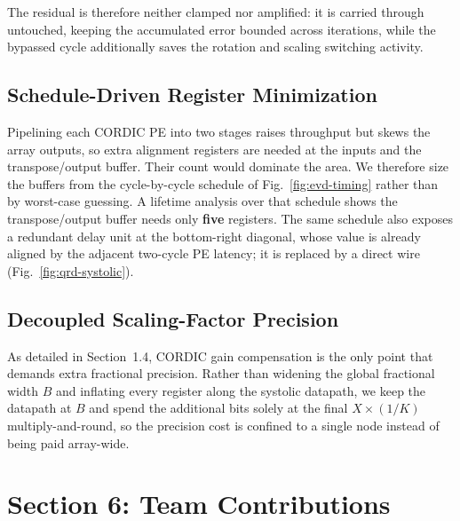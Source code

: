 \documentclass[12pt,a4paper]{report}
\begin{document}
The residual is therefore neither clamped nor amplified: it is carried through
untouched, keeping the accumulated error bounded across iterations, while the bypassed
cycle additionally saves the rotation and scaling switching activity.

\section{Schedule-Driven Register Minimization}

Pipelining each CORDIC PE into two stages raises throughput but skews the array
outputs, so extra alignment registers are needed at the inputs and the
transpose/output buffer. Their count would dominate the area. We therefore size the
buffers from the cycle-by-cycle schedule of Fig.~\ref{fig:evd-timing} rather than by
worst-case guessing. A lifetime analysis over that schedule shows the
transpose/output buffer needs only \textbf{five} registers. The same schedule also exposes a redundant delay unit at the bottom-right diagonal,
whose value is already aligned by the adjacent two-cycle PE latency; it is replaced by
a direct wire (Fig.~\ref{fig:qrd-systolic}).

\section{Decoupled Scaling-Factor Precision}

As detailed in Section~1.4, CORDIC gain compensation is the only point that demands
extra fractional precision. Rather than widening the global fractional width $B$ and
inflating every register along the systolic datapath, we keep the datapath at $B$ and
spend the additional bits solely at the final $X\times(1/K)$ multiply-and-round, so
the precision cost is confined to a single node instead of being paid array-wide.


\chapter{Section 6: Team Contributions}
\end{document}
